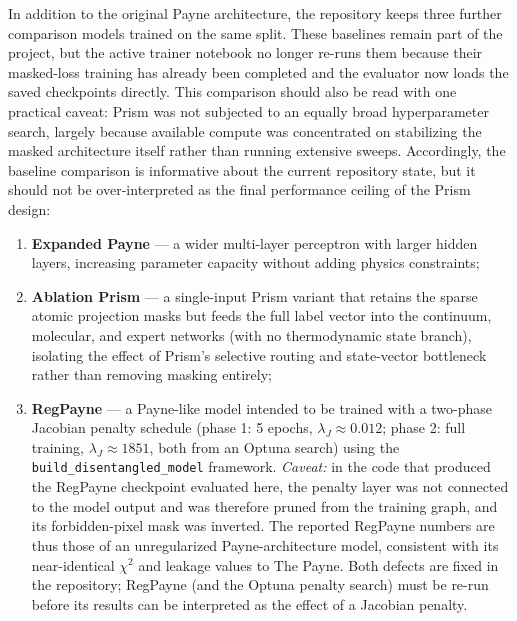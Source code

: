 \documentclass[preprint]{aastex701-1/aastex701}
\begin{document}
In addition to the original Payne architecture, the repository keeps three further
comparison models trained on the same split. These baselines remain part of the project,
but the active trainer notebook no longer re-runs them because their masked-loss training
has already been completed and the evaluator now loads the saved checkpoints directly.
This comparison should also be read with one practical caveat: Prism was not subjected to
an equally broad hyperparameter search, largely because available compute was concentrated
on stabilizing the masked architecture itself rather than running extensive sweeps.
Accordingly, the baseline comparison is informative about the current repository state, but
it should not be over-interpreted as the final performance ceiling of the Prism design:
\begin{enumerate}
\item \textbf{Expanded Payne} --- a wider multi-layer perceptron with larger hidden layers,
      increasing parameter capacity without adding physics constraints;
\item \textbf{Ablation Prism} --- a single-input Prism variant that retains the sparse
      atomic projection masks but feeds the full label vector into the continuum,
      molecular, and expert networks (with no thermodynamic state branch), isolating the
      effect of Prism's selective routing and state-vector bottleneck rather than removing
      masking entirely;
\item \textbf{RegPayne} --- a Payne-like model intended to be trained with a two-phase
      Jacobian penalty schedule (phase 1: 5 epochs, $\lambda_J \approx 0.012$; phase 2:
      full training, $\lambda_J \approx 1851$, both from an Optuna search) using the
      \texttt{build\_disentangled\_model} framework. \emph{Caveat:} in the code that
      produced the RegPayne checkpoint evaluated here, the penalty layer was not connected
      to the model output and was therefore pruned from the training graph, and its
      forbidden-pixel mask was inverted. The reported RegPayne numbers are thus those of an
      unregularized Payne-architecture model, consistent with its near-identical $\chi^2$
      and leakage values to The Payne. Both defects are fixed in the repository; RegPayne
      (and the Optuna penalty search) must be re-run before its results can be interpreted
      as the effect of a Jacobian penalty.
\end{enumerate}
\end{document}
